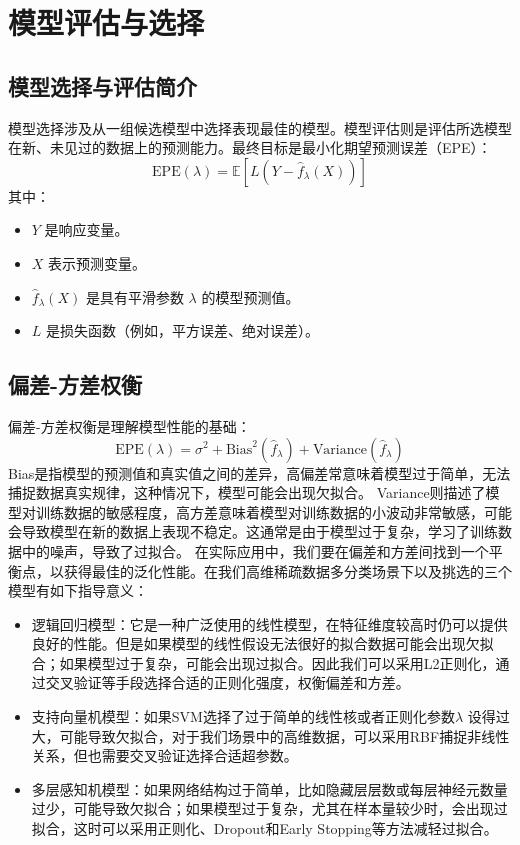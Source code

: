\documentclass[11pt,a4paper]{article}
\begin{document}
\section{模型评估与选择}

\subsection{模型选择与评估简介}

模型选择涉及从一组候选模型中选择表现最佳的模型。模型评估则是评估所选模型在新、未见过的数据上的预测能力。最终目标是最小化期望预测误差（EPE）：
\begin{equation}
\text{EPE}(\lambda) = \mathbb{E}\left[ L(Y - \hat{f}_\lambda(X)) \right]
\end{equation}
其中：
\begin{itemize}
    \item $Y$ 是响应变量。
    \item $X$ 表示预测变量。
    \item $\hat{f}_\lambda(X)$ 是具有平滑参数 $\lambda$ 的模型预测值。
    \item $L$ 是损失函数（例如，平方误差、绝对误差）。
\end{itemize}

\subsection{偏差-方差权衡}

偏差-方差权衡是理解模型性能的基础：
\begin{equation}
\text{EPE}(\lambda) = \sigma^2 + \text{Bias}^2(\hat{f}_\lambda) + \text{Variance}(\hat{f}_\lambda)
\end{equation}
Bias是指模型的预测值和真实值之间的差异，高偏差常意味着模型过于简单，无法捕捉数据真实规律，这种情况下，模型可能会出现欠拟合。
Variance则描述了模型对训练数据的敏感程度，高方差意味着模型对训练数据的小波动非常敏感，可能会导致模型在新的数据上表现不稳定。这通常是由于模型过于复杂，学习了训练数据中的噪声，导致了过拟合。
在实际应用中，我们要在偏差和方差间找到一个平衡点，以获得最佳的泛化性能。在我们高维稀疏数据多分类场景下以及挑选的三个模型有如下指导意义：
\begin{itemize}
    \item 逻辑回归模型：它是一种广泛使用的线性模型，在特征维度较高时仍可以提供良好的性能。但是如果模型的线性假设无法很好的拟合数据可能会出现欠拟合；如果模型过于复杂，可能会出现过拟合。因此我们可以采用L2正则化，通过交叉验证等手段选择合适的正则化强度，权衡偏差和方差。
    \item 支持向量机模型：如果SVM选择了过于简单的线性核或者正则化参数$\lambda$ 设得过大，可能导致欠拟合，对于我们场景中的高维数据，可以采用RBF捕捉非线性关系，但也需要交叉验证选择合适超参数。
    \item 多层感知机模型：如果网络结构过于简单，比如隐藏层层数或每层神经元数量过少，可能导致欠拟合；如果模型过于复杂，尤其在样本量较少时，会出现过拟合，这时可以采用正则化、Dropout和Early Stopping等方法减轻过拟合。
\end{itemize}
\end{document}
